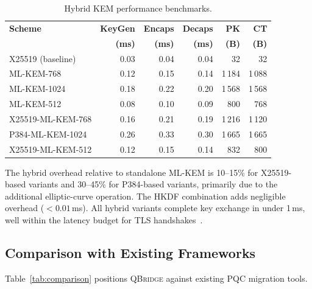 \documentclass[conference,10pt]{IEEEtran}
\newcommand{\system}{\textsc{QBridge}}
\begin{document}
\begin{table}[t]
\centering
\caption{Hybrid KEM performance benchmarks.}
\label{tab:hybrid-perf}
\footnotesize
\begin{tabular}{@{}lrrrrr@{}}
\toprule
\textbf{Scheme} & \textbf{KeyGen} & \textbf{Encaps} & \textbf{Decaps} & \textbf{PK} & \textbf{CT} \\
 & \textbf{(ms)} & \textbf{(ms)} & \textbf{(ms)} & \textbf{(B)} & \textbf{(B)} \\
\midrule
X25519 (baseline)      & 0.03 & 0.04 & 0.04 & 32    & 32    \\
ML-KEM-768             & 0.12 & 0.15 & 0.14 & 1\,184 & 1\,088 \\
ML-KEM-1024            & 0.18 & 0.22 & 0.20 & 1\,568 & 1\,568 \\
ML-KEM-512             & 0.08 & 0.10 & 0.09 & 800   & 768   \\
\midrule
X25519-ML-KEM-768      & 0.16 & 0.21 & 0.19 & 1\,216 & 1\,120 \\
P384-ML-KEM-1024       & 0.26 & 0.33 & 0.30 & 1\,665 & 1\,665 \\
X25519-ML-KEM-512      & 0.12 & 0.15 & 0.14 & 832   & 800   \\
\bottomrule
\end{tabular}
\end{table}

The hybrid overhead relative to standalone ML-KEM is 10--15\% for
X25519-based variants and 30--45\% for P384-based variants, primarily due
to the additional elliptic-curve operation. The HKDF combination adds
negligible overhead ($<0.01$\,ms). All hybrid variants complete key
exchange in under 1\,ms, well within the latency budget for TLS
handshakes~\cite{paquin2020}.

\subsection{Comparison with Existing Frameworks}

Table~\ref{tab:comparison} positions \system{} against existing PQC
migration tools.
\end{document}
